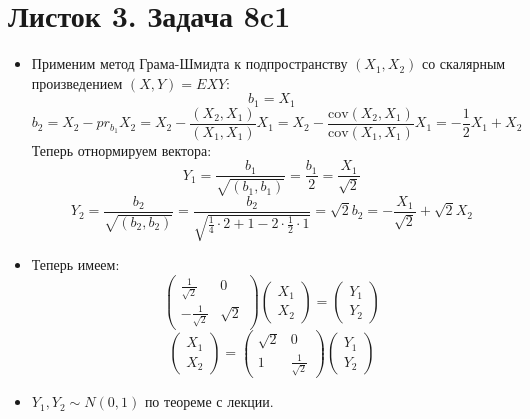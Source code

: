 




\section{Листок 3. Задача 8c1}
\begin{itemize}
\item Применим метод Грама-Шмидта к подпространству $\left(X_1, X_2\right)$ со скалярным произведением $\left(X, Y\right) = E XY$:
\[
    b_1 = X_1
\]
\[
    b_2 = X_2 - pr_{b_1} X_2 = X_2 - \frac{\left(X_2, X_1\right)}{\left(X_1, X_1\right)}X_1 = X_2 - \frac{\text{cov}\left(X_2, X_1\right)}{\text{cov}\left(X_1, X_1\right)} X_1 = -\frac 1 2 X_1 + X_2
\]
Теперь отнормируем вектора:
\[
    Y_1 = \frac{b_1}{\sqrt{\left(b_1, b_1\right)} }= \frac{b_1}{2} = \frac{X_1}{\sqrt{2}}
\]
\[
    Y_2 = \frac{b_2}{\sqrt{\left(b_2, b_2\right)}} = \frac{b_2}{\sqrt{\frac 1 4 \cdot 2 + 1 - 2 \cdot \frac 1 2 \cdot 1}} = \sqrt{2}b_2 = -\frac{X_1}{\sqrt{2}} + \sqrt{2} X_2
\]

\item Теперь имеем:
\[
    \begin{pmatrix}
    \frac {1} {\sqrt {2}} & 0 \\
    -\frac {1} {\sqrt{2}} & \sqrt {2}
    \end{pmatrix}
    \begin{pmatrix}
    X_1 \\
    X_2
    \end{pmatrix} = 
    \begin{pmatrix}
    Y_1 \\
    Y_2
    \end{pmatrix}
\]
\[
    \begin{pmatrix}
    X_1 \\
    X_2
    \end{pmatrix} = 
    \begin{pmatrix}
    \sqrt 2 & 0 \\
    1 & \frac{ 1}{ \sqrt{2}}
    \end{pmatrix}
    \begin{pmatrix}
    Y_1 \\
    Y_2
    \end{pmatrix}
\]

\item $Y_1, Y_2 \sim N\left(0, 1\right)$ по теореме с лекции.
\end{itemize}

